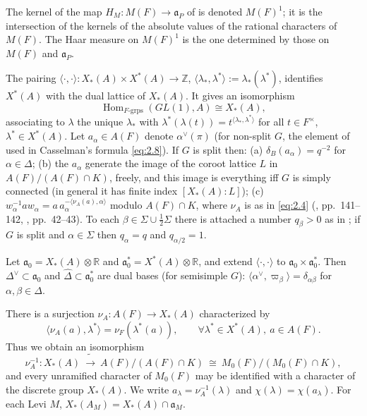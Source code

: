 \documentclass[12pt,letterpaper]{article}
\numberwithin{equation}{section}
\theoremstyle{plain}
\theoremstyle{remark}
\theoremstyle{plain}
\theoremstyle{definition}
\theoremstyle{remark}
\theoremstyle{remark}
\newcommand{\fa}{\mathfrak{a}}
\newcommand{\ip}[1]{\langle #1\rangle}
\DeclareMathOperator{\Hom}{Hom}
\begin{document}
The kernel of the map $H_M:M(F)\to\fa_P$ of \cite{Ar78} is denoted $M(F)^1$; it is the intersection of the kernels of the absolute values of the rational characters of $M(F)$. The Haar measure on $M(F)^1$ is the one determined by those on $M(F)$ and $\fa_P$.

The pairing $\ip{\cdot,\cdot}:X_*(A)\times X^*(A)\to\mathbb{Z}$, $\ip{\lambda_*,\lambda^*}:=\lambda_*(\lambda^*)$, identifies $X^*(A)$ with the dual lattice of $X_*(A)$. It gives an isomorphism
\begin{equation}\label{eq:2.3}
\Hom_{F\text{-grps}}(GL(1),A)\cong X_*(A),
\end{equation}
associating to $\lambda$ the unique $\lambda_*$ with $\lambda^*(\lambda(t))=t^{\ip{\lambda_*,\lambda^*}}$ for all $t\in F^\times$, $\lambda^*\in X^*(A)$. Let $a_\alpha\in A(F)$ denote $\alpha^\vee(\pi)$ (for non-split $G$, the element of \cite[\S3]{Ca79} used in Casselman's formula \eqref{eq:2.8}). If $G$ is split then: (a) $\delta_B(a_\alpha)=q^{-2}$ for $\alpha\in\Delta$; (b) the $a_\alpha$ generate the image of the coroot lattice $L$ in $A(F)/(A(F)\cap K)$, freely, and this image is everything iff $G$ is simply connected (in general it has finite index $[X_*(A):L]$); (c) $w_\alpha^{-1}aw_\alpha=a\,a_\alpha^{-\ip{\nu_A(a),\alpha}}$ modulo $A(F)\cap K$, where $\nu_A$ is as in \eqref{eq:2.4} (\cite{Ca79}, pp.~141--142, \cite{Ma71}, pp.~42--43). To each $\beta\in\Sigma\cup\frac12\Sigma$ there is attached a number $q_\beta>0$ as in \cite{Ca79}; if $G$ is split and $\alpha\in\Sigma$ then $q_\alpha=q$ and $q_{\alpha/2}=1$.

Let $\fa_0=X_*(A)\otimes\mathbb{R}$ and $\fa_0^*=X^*(A)\otimes\mathbb{R}$, and extend $\ip{\cdot,\cdot}$ to $\fa_0\times\fa_0^*$. Then $\Delta^\vee\subset\fa_0$ and $\hat\Delta\subset\fa_0^*$ are dual bases (for semisimple $G$): $\ip{\alpha^\vee,\varpi_\beta}=\delta_{\alpha\beta}$ for $\alpha,\beta\in\Delta$.

There is a surjection $\nu_A:A(F)\to X_*(A)$ characterized by
\begin{equation}\label{eq:2.4}
\ip{\nu_A(a),\lambda^*}=\nu_F(\lambda^*(a)),\qquad\forall\lambda^*\in X^*(A),\ a\in A(F).
\end{equation}
Thus we obtain an isomorphism
\begin{equation}\label{eq:2.5}
\nu_A^{-1}:X_*(A)\ \tilde\longrightarrow\ A(F)/(A(F)\cap K)\ \cong\ M_0(F)/(M_0(F)\cap K),
\end{equation}
and every unramified character of $M_0(F)$ may be identified with a character of the discrete group $X_*(A)$. We write $a_\lambda=\nu_A^{-1}(\lambda)$ and $\chi(\lambda)=\chi(a_\lambda)$. For each Levi $M$, $X_*(A_M)=X_*(A)\cap\fa_M$.
\end{document}
